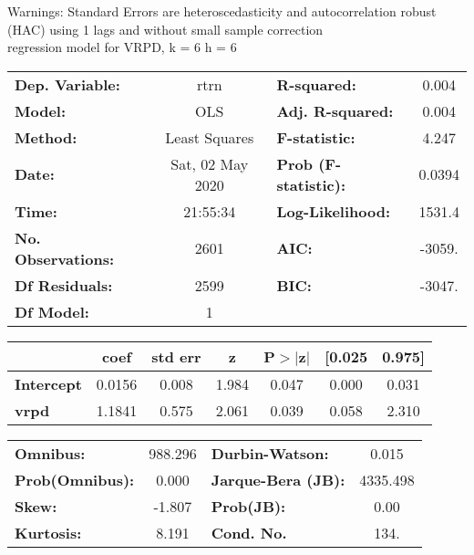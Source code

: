 Warnings: \newline
 [1] Standard Errors are heteroscedasticity and autocorrelation robust (HAC) using 1 lags and without small sample correction\\ 

regression model for VRPD, k = 6 h = 6\begin{center}
\begin{tabular}{lclc}
\toprule
\textbf{Dep. Variable:}    &       rtrn       & \textbf{  R-squared:         } &     0.004   \\
\textbf{Model:}            &       OLS        & \textbf{  Adj. R-squared:    } &     0.004   \\
\textbf{Method:}           &  Least Squares   & \textbf{  F-statistic:       } &     4.247   \\
\textbf{Date:}             & Sat, 02 May 2020 & \textbf{  Prob (F-statistic):} &   0.0394    \\
\textbf{Time:}             &     21:55:34     & \textbf{  Log-Likelihood:    } &    1531.4   \\
\textbf{No. Observations:} &        2601      & \textbf{  AIC:               } &    -3059.   \\
\textbf{Df Residuals:}     &        2599      & \textbf{  BIC:               } &    -3047.   \\
\textbf{Df Model:}         &           1      & \textbf{                     } &             \\
\bottomrule
\end{tabular}
\begin{tabular}{lcccccc}
                   & \textbf{coef} & \textbf{std err} & \textbf{z} & \textbf{P$> |$z$|$} & \textbf{[0.025} & \textbf{0.975]}  \\
\midrule
\textbf{Intercept} &       0.0156  &        0.008     &     1.984  &         0.047        &        0.000    &        0.031     \\
\textbf{vrpd}      &       1.1841  &        0.575     &     2.061  &         0.039        &        0.058    &        2.310     \\
\bottomrule
\end{tabular}
\begin{tabular}{lclc}
\textbf{Omnibus:}       & 988.296 & \textbf{  Durbin-Watson:     } &    0.015  \\
\textbf{Prob(Omnibus):} &   0.000 & \textbf{  Jarque-Bera (JB):  } & 4335.498  \\
\textbf{Skew:}          &  -1.807 & \textbf{  Prob(JB):          } &     0.00  \\
\textbf{Kurtosis:}      &   8.191 & \textbf{  Cond. No.          } &     134.  \\
\bottomrule
\end{tabular}
\end{center}

